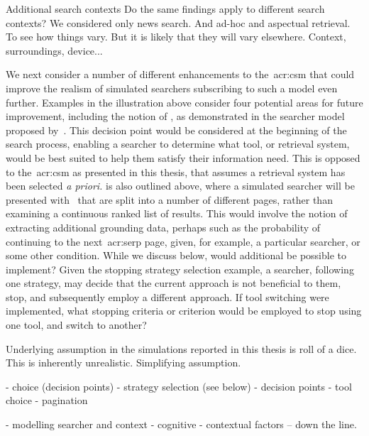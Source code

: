 
Additional search contexts
Do the same findings apply to different search contexts? We considered only news search. And ad-hoc and aspectual retrieval. To see how things vary. But it is likely that they will vary elsewhere. Context, surroundings, device...


We next consider a number of different enhancements to the~\gls{acr:csm} that could improve the realism of simulated searchers subscribing to such a model even further. Examples in the illustration above consider four potential areas for future improvement, including the notion of , as demonstrated in the searcher model proposed by~\cite{thomas2014modelling_behaviour}. This decision point would be considered at the beginning of the search process, enabling a searcher to determine what tool, or retrieval system, would be best suited to help them satisfy their information need. This is opposed to the~\gls{acr:csm} as presented in this thesis, that assumes a retrieval system has been selected \emph{a priori.}  is also outlined above, where a simulated searcher will be presented with~ that are split into a number of different pages, rather than examining a continuous ranked list of results. This would involve the notion of extracting additional grounding data, perhaps such as the probability of continuing to the next~\gls{acr:serp} page, given, for example, a particular searcher, or some other condition. While we discuss  below, would additional  be possible to implement? Given the stopping strategy selection example, a searcher, following one strategy, may decide that the current approach is not beneficial to them, stop, and subsequently employ a different approach. If tool switching were implemented, what stopping criteria or criterion would be employed to stop using one tool, and switch to another?

 Underlying assumption in the simulations reported in this thesis is roll of a dice. This is inherently unrealistic. Simplifying assumption. 

- choice (decision points)
    - strategy selection (see below)
    - decision points
        - tool choice
        - pagination

- modelling searcher and context
    - cognitive
    - contextual factors -- down the line.


